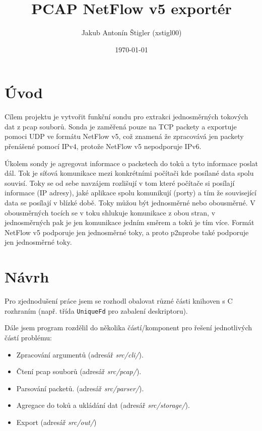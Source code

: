 \documentclass{article}
\title{PCAP NetFlow v5 exportér}
\author{Jakub Antonín Štigler (xstigl00)}
\date{\today}
\begin{document}
\maketitle

\newpage

\tableofcontents

\newpage

\section{Úvod}
Cílem projektu je vytvořit funkční sondu pro extrakci jednosměrných tokových
dat z pcap souborů. Sonda je zaměřená pouze na TCP packety a exportuje pomoci
UDP ve formátu NetFlow v5, což znamená že zpracovává jen packety přenášené
pomocí IPv4, protože NetFlow v5 nepodporuje IPv6.

Úkolem sondy je agregovat informace o packetech do toků a tyto informace poslat
dál. Tok je síťová komunikace mezi konkrétními počítači kde posílané data spolu
souvisí. Toky se od sebe navzájem rozlišují v tom které počítače si posílají
informace (IP adresy), jaké aplikace spolu komunikují (porty) a tím že
související data se posílají v blízké době. Toky můžou být jednosměrné nebo
obousměrné. V obousměrných tocích se v toku shlukuje komunikace z obou stran,
v jednosměrných pak je jen komunikace jedním směrem a toků je tím více. Formát
NetFlow v5 podporuje jen jednosměrné toky, a proto p2nprobe také podporuje jen
jednosměrné toky.

\section{Návrh}
Pro zjednodušení práce jsem se rozhodl obalovat různé části knihoven s C
rozhraním (např. třída \verb|UniqueFd| pro zabalení deskriptoru).

Dále jsem program rozdělil do několika částí/komponent pro řešení jednotlivých
částí problému:
\begin{itemize}
    \item Zpracování argumentů (adresář \textit{src/cli/}).
    \item Čtení pcap souborů (adresář \textit{src/pcap/}).
    \item Parsování packetů. (adresář \textit{src/parser/}).
    \item Agregace do toků a ukládání dat (adresář \textit{src/storage/}).
    \item Export (adresář \textit{src/out/})
\end{itemize}
\end{document}
